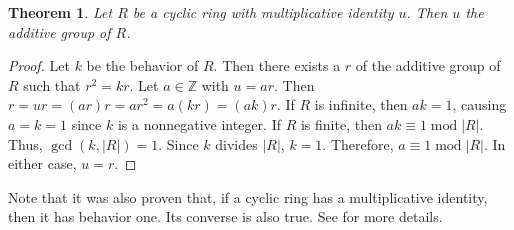 \documentclass[12pt]{article}
\newtheorem*{thm*}{Theorem}
\begin{document}
\begin{thm*}
Let $R$ be a cyclic ring with multiplicative identity $u$.  Then $u$  the additive group of $R$.
\end{thm*}

\begin{proof}
Let $k$ be the behavior of $R$.  Then there exists a  $r$ of the additive group of $R$ such that $r^2=kr$.  Let $a \in \mathbb{Z}$ with $u=ar$.  Then $r=ur=(ar)r=ar^2=a(kr)=(ak)r$.  If $R$ is infinite, then $ak=1$, causing $a=k=1$ since $k$ is a nonnegative integer.  If $R$ is finite, then $ak \equiv 1 \operatorname{mod} |R|$.  Thus, $\gcd(k,|R|)=1$.  Since $k$ divides $|R|$, $k=1$.  Therefore, $a \equiv 1 \operatorname{mod} |R|$.  In either case, $u=r$.
\end{proof}

Note that it was also proven that, if a cyclic ring has a multiplicative identity, then it has behavior one.  Its converse is also true.  See  for more details.
\end{document}
